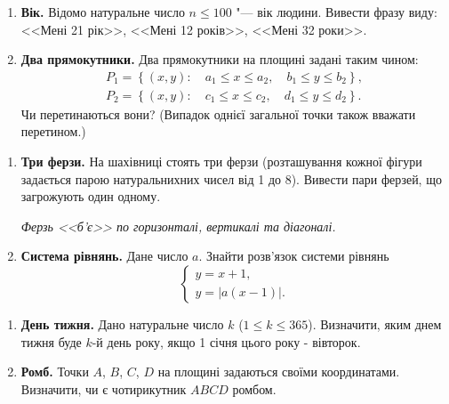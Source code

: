 \documentclass{scrreprt}
\begin{document}
	\newpage
	
	
	{\large
		\begin{enumerate}
			\item \textbf{Вік.} Відомо натуральне число $n\leqslant 100$ "--- вік людини. Вивести фразу виду: <<Мені 21 рік>>, <<Мені 12 років>>, <<Мені 32 роки>>.
			\item \textbf{Два прямокутники.} Два прямокутники на площині задані таким чином:
			$$
			\begin{array}{c}
				P_1 = \left\{(x, y):\quad a_1\leqslant x\leqslant a_2,\quad b_1\leqslant y\leqslant b_2\right\},\\ 
				P_2 = \left\{(x, y):\quad c_1\leqslant x\leqslant c_2,\quad d_1\leqslant y\leqslant d_2\right\}.
			\end{array}
			$$
			Чи перетинаються вони? (Випадок однієї загальної точки також вважати перетином.)
		\end{enumerate}
	}
	
	\vspace{2cm}
	
	
	{\large
		\begin{enumerate}
			\item \textbf{Три ферзи.} На шахівниці стоять три ферзи (розташування кожної фігури за\-да\-ється парою на\-ту\-ральних\-них чисел від 1 до 8). Вивести пари ферзей, що загрожують один одному.
			
			{\itshape Ферзь <<б'є>> по горизонталі, вертикалі та діагоналі.}
			\item \textbf{Система рівнянь.} Дане число $a$. Знайти розв'язок системи рівнянь
			$$
			\begin{cases}
				y=x+1,\\
				y=|a(x-1)|.
			\end{cases}
			$$
		\end{enumerate}
	}
	
	\newpage
	
	
	{\large
		\begin{enumerate}
			\item \textbf{День тижня.} Дано натуральне число $k$ ($1\leqslant k\leqslant 365$). Визначити, яким днем тижня буде $k$-й день року, якщо 1 січня цього року - вівторок.
			\item \textbf{Ромб.} Точки $A$, $B$, $C$, $D$ на площині задаються своїми координатами. Визначити, чи є чотирикутник $ABCD$ ромбом.
		\end{enumerate}
	}
	
\end{document}
